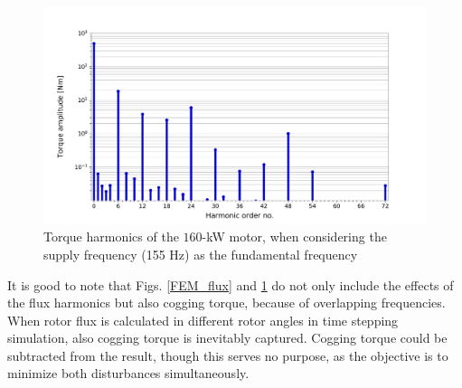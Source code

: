 


\begin{figure}[ht] 
    \centering
    \includegraphics[width=1.0\linewidth]{images/fem-flux-harmonics.pdf} 
    \caption{Torque harmonics of the $160$-kW motor, when considering the supply frequency (155 Hz) as the fundamental frequency}
    \label{FEM_flux_harmonics}
\end{figure}

It is good to note that Figs. \ref{FEM_flux} and \ref{FEM_flux_harmonics} do not only include the effects of the flux harmonics but also cogging torque, because of overlapping frequencies. When rotor flux is calculated in different rotor angles in time stepping simulation, also cogging torque is inevitably captured. Cogging torque could be subtracted from the result, though this serves no purpose, as the objective is to minimize both disturbances simultaneously.

